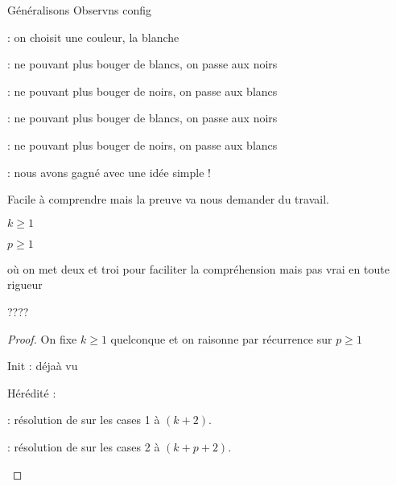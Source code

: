 Généralisons Observns config 

\begin{mvts}
	\medskip
	\item  {} : on choisit une couleur, la blanche

	\medskip
	\item  {} : ne pouvant plus bouger de blancs, on passe aux noirs

	\medskip
	\item  {}

	\medskip
	\item  {}

	\medskip
	\item  {} : ne pouvant plus bouger de noirs, on passe aux blancs

	\medskip
	\item  {}

	\medskip
	\item  {} : ne pouvant plus bouger de blancs, on passe aux noirs

	\medskip
	\item  {}

	\medskip
	\item  {} : ne pouvant plus bouger de noirs, on passe aux blancs

	\medskip
	\item  {}

	\medskip
	\item  {}

	\medskip
	\item  {} : nous avons gagné avec une idée simple !
\end{mvts}

Facile à comprendre mais la preuve va nous demander du travail.


\begin{fact}
	$k \geq 1$
	
	$p \geq 1$
		
	
	 où on met deux \black{} et troi \white{} pour faciliter la compréhension mais pas vrai en toute rigueur
	
	????
\end{fact}

\begin{proof}
	On fixe $k \geq 1$ quelconque et on raisonne par récurrence sur $p \geq 1$
	
	Init : déjaà vu
	
	Hérédité : 
	
	\begin{mvts}
		\medskip
		\item  {}

		\medskip
		\item  {} : résolution de  sur les cases 1 à $(k+2)$.

		\medskip
		\item  {} : résolution de  sur les cases 2 à $(k+p+2)$.
	\end{mvts}
	
\end{proof}

